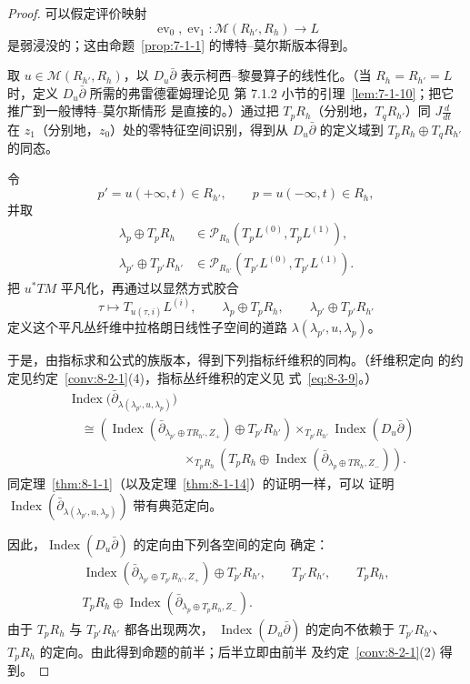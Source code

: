 \begin{proof}
可以假定评价映射
\[
 \operatorname{ev}_0,\operatorname{ev}_1\colon
 \mathcal M(R_{h'},R_h)\longrightarrow L
\]
是弱浸没的；这由命题~\ref{prop:7-1-1} 的博特--莫尔斯版本得到。

取 $u\in\mathcal M(R_{h'},R_h)$，以
$D_u\bar\partial$ 表示柯西--黎曼算子的线性化。（当
$R_h=R_{h'}=L$ 时，定义 $D_u\bar\partial$ 所需的弗雷德霍姆理论见
第 7.1.2 小节的引理~\ref{lem:7-1-10}；把它推广到一般博特--莫尔斯情形
是直接的。）通过把 $T_pR_h$（分别地，$T_qR_{h'}$）同
$J\frac d{dt}$ 在 $z_1$（分别地，$z_0$）处的零特征空间识别，得到从
$D_u\bar\partial$ 的定义域到
$T_pR_h\oplus T_qR_{h'}$ 的同态。

令
\[
 p'=u(+\infty,t)\in R_{h'},\qquad
 p=u(-\infty,t)\in R_h,
\]
并取
\[
\begin{aligned}
 \lambda_p\oplus T_pR_h
 &\in\mathcal P_{R_h}(T_pL^{(0)},T_pL^{(1)}),\\
 \lambda_{p'}\oplus T_{p'}R_{h'}
 &\in\mathcal P_{R_{h'}}(T_{p'}L^{(0)},T_{p'}L^{(1)}).
\end{aligned}
\]
把 $u^*TM$ 平凡化，再通过以显然方式胶合
\[
 \tau\longmapsto T_{u(\tau,i)}L^{(i)},\qquad
 \lambda_p\oplus T_pR_h,\qquad
 \lambda_{p'}\oplus T_{p'}R_{h'}
\]
定义这个平凡丛纤维中拉格朗日线性子空间的道路
$\lambda(\lambda_{p'},u,\lambda_p)$。%

于是，由指标求和公式的族版本，得到下列指标纤维积的同构。（纤维积定向
的约定见约定~\ref{conv:8-2-1}(4)，指标丛纤维积的定义见
式~\eqref{eq:8-3-9}。）
\[
\begin{aligned}
 &\operatorname{Index}
 \bigl(\bar\partial_{\lambda(\lambda_{p'},u,\lambda_p)}\bigr)\\
 &\quad\cong
 \left(
 \operatorname{Index}
 (\bar\partial_{\lambda_{p'}\oplus TR_{h'},Z_+})
 \oplus T_{p'}R_{h'}
 \right)
 \mathop{\times}_{T_{p'}R_{h'}}
 \operatorname{Index}(D_u\bar\partial)\\
 &\hspace{9em}{}
 \mathop{\times}_{T_pR_h}
 \left(
 T_pR_h\oplus
 \operatorname{Index}
 (\bar\partial_{\lambda_p\oplus TR_h,Z_-})
 \right).
\end{aligned}
\]
同定理~\ref{thm:8-1-1}（以及定理~\ref{thm:8-1-14}）的证明一样，可以
证明
$\operatorname{Index}
(\bar\partial_{\lambda(\lambda_{p'},u,\lambda_p)})$
带有典范定向。

因此，$\operatorname{Index}(D_u\bar\partial)$ 的定向由下列各空间的定向
确定：
\[
\begin{gathered}
 \operatorname{Index}
 (\bar\partial_{\lambda_{p'}\oplus T_{p'}R_{h'},Z_+})
 \oplus T_{p'}R_{h'},\qquad
 T_{p'}R_{h'},\qquad T_pR_h,\\
 T_pR_h\oplus
 \operatorname{Index}
 (\bar\partial_{\lambda_p\oplus T_pR_h,Z_-}).
\end{gathered}
\]
由于 $T_pR_h$ 与 $T_{p'}R_{h'}$ 都各出现两次，
$\operatorname{Index}(D_u\bar\partial)$ 的定向不依赖于
$T_{p'}R_{h'}$、$T_pR_h$ 的定向。由此得到命题的前半；后半立即由前半
及约定~\ref{conv:8-2-1}(2) 得到。
\end{proof}

